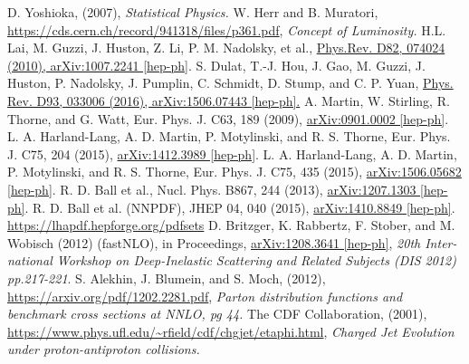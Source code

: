 \documentclass[12pt, onecolumn]{revtex4}    %
\begin{document}
\begin{thebibliography}{99}
 D. Yoshioka, (2007), \textit{Statistical Physics.}
 W. Herr and B. Muratori, \url{https://cds.cern.ch/record/941318/files/p361.pdf}, \textit{Concept of Luminosity.}
 H.L. Lai, M. Guzzi, J. Huston, Z. Li, P. M. Nadolsky, et al., \url{Phys.Rev. D82, 074024 (2010), arXiv:1007.2241 [hep-ph]}.
 S. Dulat, T.-J. Hou, J. Gao, M. Guzzi, J. Huston, P. Nadolsky, J. Pumplin, C. Schmidt, D. Stump, and C. P. Yuan, \url{Phys. Rev. D93, 033006 (2016), arXiv:1506.07443 [hep-ph].}
 A. Martin, W. Stirling, R. Thorne, and G. Watt, Eur. Phys. J. C63, 189 (2009), \url{arXiv:0901.0002 [hep-ph]}.
 L. A. Harland-Lang, A. D. Martin, P. Motylinski, and R. S. Thorne, Eur. Phys. J. C75, 204 (2015), \url{arXiv:1412.3989 [hep-ph]}.
 L. A. Harland-Lang, A. D. Martin, P. Motylinski, and R. S. Thorne, Eur. Phys. J. C75, 435 (2015), \url{arXiv:1506.05682 [hep-ph]}.
 R. D. Ball et al., Nucl. Phys. B867, 244 (2013), \url{arXiv:1207.1303 [hep-ph]}.
 R. D. Ball et al. (NNPDF), JHEP 04, 040 (2015), \url{arXiv:1410.8849 [hep-ph]}.
 \url{https://lhapdf.hepforge.org/pdfsets}
 D. Britzger, K. Rabbertz, F. Stober, and M. Wobisch (2012) (fastNLO), in Proceedings, \url{arXiv:1208.3641 [hep-ph]}, \textit{20th Inter-national Workshop on Deep-Inelastic Scattering and Related Subjects (DIS 2012) pp.217-221}.
 S. Alekhin, J. Blumein, and S. Moch, (2012), \url{https://arxiv.org/pdf/1202.2281.pdf}, \textit{Parton distribution functions and benchmark cross sections at NNLO, pg 44.} 
 The CDF Collaboration, (2001), \url{https://www.phys.ufl.edu/~rfield/cdf/chgjet/etaphi.html}, \textit{Charged Jet Evolution under proton-antiproton collisions.}



\end{thebibliography} 
\end{document}
